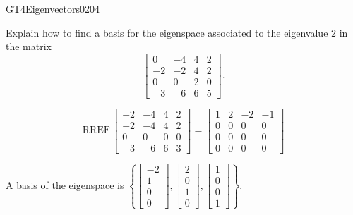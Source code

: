 \begin{exercise}{GT4}{Eigenvectors}{0204} 
\begin{exerciseStatement} 

Explain how to find a basis for the eigenspace associated to the eigenvalue \(2\) in the matrix \[\left[\begin{array}{cccc}
0 & -4 & 4 & 2 \\
-2 & -2 & 4 & 2 \\
0 & 0 & 2 & 0 \\
-3 & -6 & 6 & 5
\end{array}\right].\]

 \end{exerciseStatement}
 \begin{exerciseAnswer} 

\[\mathrm{RREF}\,\left[\begin{array}{cccc}
-2 & -4 & 4 & 2 \\
-2 & -4 & 4 & 2 \\
0 & 0 & 0 & 0 \\
-3 & -6 & 6 & 3
\end{array}\right]=\left[\begin{array}{cccc}
1 & 2 & -2 & -1 \\
0 & 0 & 0 & 0 \\
0 & 0 & 0 & 0 \\
0 & 0 & 0 & 0
\end{array}\right]\]

 

A basis of the eigenspace is \(\left\{ \left[\begin{array}{c}
-2 \\
1 \\
0 \\
0
\end{array}\right] , \left[\begin{array}{c}
2 \\
0 \\
1 \\
0
\end{array}\right] , \left[\begin{array}{c}
1 \\
0 \\
0 \\
1
\end{array}\right] \right\}\).

 \end{exerciseAnswer}
 \end{exercise}



